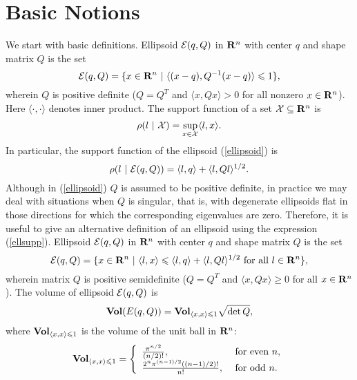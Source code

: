 \section{Basic Notions}
We start with basic definitions.
\bd
Ellipsoid $\EE(q,Q)$ in ${\bf R}^n$ with  center $q$
and  shape matrix $Q$ is the set
\begin{equation}
\EE(q,Q) = \{ x \in {\bf R}^n ~|~ \langle (x-q), Q^{-1}(x-q)\rangle\leq1 \},
\label{ellipsoid}
\end{equation}
wherein  $Q$ is positive definite ($Q=Q^T$ and $\langle x, Qx\rangle>0$
for all nonzero $x\in{\bf R}^n$).
\label{ellipsoiddef0}
\ed
Here $\langle\cdot,\cdot\rangle$ denotes inner product.
\bd
The support function of a set $\XX\subseteq{\bf R}^n$ is
\[ \rho(l~|~\XX) = \sup_{x\in\XX} \langle l,x\rangle. \]
\ed
In particular, the support function of the ellipsoid (\ref{ellipsoid}) is
\begin{equation}
\rho(l~|~\EE(q,Q)) = \langle l, q\rangle + \langle l, Ql\rangle^{1/2}.
\label{ellsupp}
\end{equation}
Although in (\ref{ellipsoid})    $Q$ is assumed to be
positive definite, in practice we may deal with situations when $Q$ is
singular, that is, with degenerate ellipsoids flat in those directions
for which the corresponding eigenvalues are zero. Therefore, it is
useful to give an alternative definition of an ellipsoid using the
expression (\ref{ellsupp}).
\bd
Ellipsoid $\EE(q,Q)$ in ${\bf R}^n$ with  center $q$
and  shape matrix $Q$ is the set
\begin{equation}
\EE(q,Q) = \{ x \in {\bf R}^n ~|~
\langle l,x\rangle\leq\langle l,q\rangle + \langle l,Ql\rangle^{1/2}
\mbox{ for all } l\in{\bf R}^n \},
\label{ellipsoid2}
\end{equation}
wherein matrix $Q$ is positive semidefinite
($Q=Q^T$ and $\langle x, Qx\rangle\geq0$ for all $x\in{\bf R}^n$).
\label{ellipsoiddef}
\ed
{}
The volume of ellipsoid $\EE(q,Q)$ is
\begin{equation}
{\bf Vol}(E(q,Q)) = {\bf Vol}_{\langle x,x\rangle\leq1}\sqrt{\det Q},
\label{ellvolume}
\end{equation}
where ${\bf Vol}_{\langle x,x\rangle\leq 1}$ is the volume of the unit ball
in ${\bf R}^n$:
\begin{equation}
{\bf Vol}_{\langle x,x\rangle\leq 1} = \left\{\begin{array}{ll}
\frac{\pi^{n/2}}{(n/2)!}, &
\mbox{ for even } n,\\
\frac{2^n\pi^{(n-1)/2}\left((n-1)/2\right)!}{n!}, &
\mbox{ for odd } n. \end{array}\right.
\label{ellunitball}
\end{equation}
